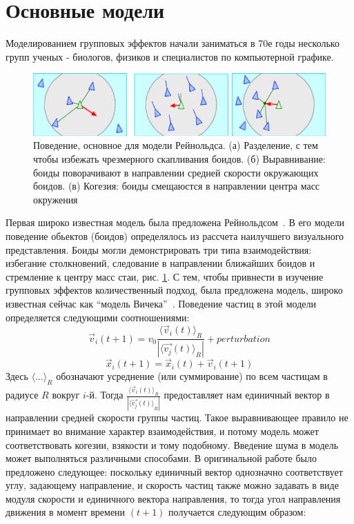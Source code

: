     \section{Основные модели} %
    \label{sec:CompModelsBasics}
    Моделированием групповых эффектов начали заниматься в 70е годы несколько групп ученых - биологов, физиков и специалистов по компьютерной графике. 
    \begin{figure}
        \centering
        \includegraphics[width=\textwidth]{Images/Fig31_CollectiveMotion}
        \caption{Поведение, основное для модели Рейнольдса. (а) Разделение, с тем чтобы избежать чрезмерного скапливания боидов. (б) Выравнивание: боиды поворачивают в направлении средней скорости окружающих боидов. (в) Когезия: боиды смещаюстся в направлении центра масс окружения}
        \label{fig:ReynoldsModel}
    \end{figure}
    Первая широко известная модель была предложена Рейнольдсом~\cite{reynolds1987}. В его модели поведение обьектов (боидов) определялось из рассчета наилучшего визуального представления. Боиды могли демонстрировать три типа взаимодействия: избегание столкновений, следование в направлении ближайших боидов и стремление к центру масс стаи, рис. \ref{fig:ReynoldsModel}. С тем, чтобы привнести в изучение групповых эффектов количественный подход, была предложена модель, широко известная сейчас как ``модель Вичека''~\cite{vicsek1995}. Поведение частиц в этой модели определяется следующими соотношениями:
    \begin{equation}
        \vec{v}_i(t+1) = v_0 \frac{{\langle \vec{v}_i(t) \rangle}_R}{|{\langle \vec{v_j}(t) \rangle}_R|} + perturbation
    \end{equation}
    \begin{equation}
        \vec{x}_i(t+1) = \vec{x}_i(t)+\vec{v}_i(t+1)
    \end{equation}
    Здесь ${\langle \dots \rangle}_R$ обозначают усреднение (или суммирование) по всем частицам в радиусе $R$ вокруг $i$-й. Тогда $ \frac{{\langle \vec{v}_i(t) \rangle}_R}{|{\langle \vec{v_j}(t) \rangle}_R|}$ предоставляет нам единичный вектор в направлении средней скорости группы частиц. Такое выравнивающее правило не принимает во внимание характер взаимодействия, и потому модель может соответствовать когезии, взякости и тому подобному. Введение шума в модель может выполняться различными способами. В оригинальной работе было предложено следующее: поскольку единичный вектор однозначно соответствует углу, задающему направление, и скорость частиц также можно задавать в виде модуля скорости и единичного вектора направления, то тогда угол направления движения в момент времени $(t+1)$ получается следующим образом:
